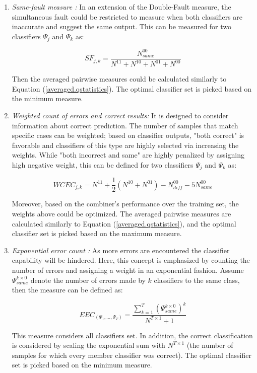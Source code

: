 \begin{enumerate}
   
 \item \textit{Same-fault measure :} In an extension of the Double-Fault measure, the simultaneous fault could be restricted to measure when both classifiers are inaccurate  and suggest the same output. This can be measured for two classifiers $\Psi_j$ and $\Psi_{k}$ as:
 
 
 \begin{equation}
\label{samefault.measure}
 SF_{j,k}=\frac{N_{same}^{00}}{N^{11}+ N^{10}+N^{01}+N^{00}}
\end{equation}  
 
Then the averaged pairwise measures could be calculated similarly to Equation (\ref{averaged.qstatistics}). The optimal classifier set is picked based on the minimum measure.


\item \textit{Weighted count of errors and correct results:} It is designed to consider information about correct prediction. The number of samples that match specific cases can be weighted; based on classifier outputs, "both correct" is favorable and classifiers of this type are highly selected via increasing the weights. While "both incorrect and same" are highly penalized by assigning high negative weight, this can be defined for two classifiers $\Psi_j$ and $\Psi_{k}$ as: 
 
 
 \begin{equation}
\label{weighted.count.errors}
WCEC_{j,k}=N^{11}+\frac{1}{2}(N^{10}+N^{01}) -N_{diff}^{00}-5N_{same}^{00}
\end{equation}   
 
Moreover, based on the combiner's performance over the training set, the weights above could be optimized. The averaged pairwise measures are calculated similarly to Equation (\ref{averaged.qstatistics}), and the optimal classifier set is picked based on the maximum measure.  

\item \textit{Exponential error count :} As more errors are encountered the classifier capability will be hindered. Here, this concept is emphasized by counting the number of errors and assigning a weight in an exponential fashion. Assume $\Psi_{same}^{k \times 0}$ denote the number of errors made by $k$ classifiers to the same class, then the measure can be defined as:

\begin{equation}
\label{exponential.error.count}
EEC_{(\Psi_1,\dots,\Psi_T)}= \frac{\sum_{k=1}^{T} (\Psi_{same}^{k \times 0})^k }{N^{T \times 1}+1}
\end{equation} 
 
This measure considers all classifiers set. In addition, the correct classification is considered by scaling the exponential sum with $N^{T \times 1}$ (the number of samples for which every member classifier was correct). The optimal classifier set is picked based on the minimum measure.    
 
 \end{enumerate}





